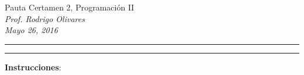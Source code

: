 \documentclass[10pt]{article}
\begin{document}
    \begin{center}
		{\Large Pauta Certamen 2, Programaci\'on II} \\
		\emph{\small Prof. Rodrigo Olivares} \\
		\emph{\scriptsize Mayo 26, 2016} 
	\end{center}

	\vspace*{-35pt}
	\begin{center}
		\rule{1\textwidth}{.3pt}
	\end{center}
	\vspace*{-42pt}
	\begin{center}
		\rule{1\textwidth}{2pt}
	\end{center}

	\vspace*{-15pt}

	{\small \textbf{Instrucciones}:}

	\vspace*{-15pt}
\end{document}

